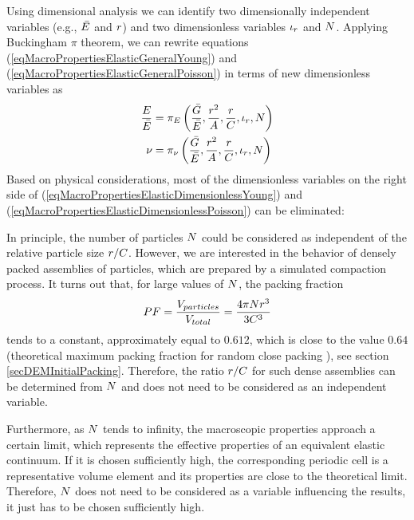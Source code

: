 Using dimensional analysis we can identify two dimensionally independent variables
(e.g., $\linkMaterialStiffnessNormal$ and $r$)
and two dimensionless variables $\iota_r$ and $N$.
Applying Buckingham $\pi$ theorem, we can rewrite equations (\ref{eqMacroPropertiesElasticGeneralYoung}) and (\ref{eqMacroPropertiesElasticGeneralPoisson}) in terms of new dimensionless variables as
\begin{align}
	\frac{\youngModulus}{\linkMaterialStiffnessNormal} &=
	\pi_\youngModulus \left(
		\frac{\linkMaterialStiffnessShear}{\linkMaterialStiffnessNormal},
		\frac{\radius^2}{\linkCrossSectionArea},
		\frac{\radius}{\cubeDimension},
		\interactionRatio,
		\numberOfParticles
	\right)
	\label{eqMacroPropertiesElasticDimensionlessYoung}
	\\
	\poissonRatio &= \pi_\poissonRatio \left(
		\frac{\linkMaterialStiffnessShear}{\linkMaterialStiffnessNormal},
		\frac{\radius^2}{\linkCrossSectionArea},
		\frac{\radius}{\cubeDimension},
		\interactionRatio,
		\numberOfParticles
	\right)
	\label{eqMacroPropertiesElasticDimensionlessPoisson}
\end{align}
Based on physical considerations, most of the dimensionless variables on the right side of (\ref{eqMacroPropertiesElasticDimensionlessYoung}) and (\ref{eqMacroPropertiesElasticDimensionlessPoisson}) can be eliminated:

In principle, the number of particles $N$ could be considered as independent of the relative particle size
$r/C$.
However, we are interested in the behavior of densely packed assemblies of particles, which are prepared by a simulated compaction process.
It turns out that, for large values of $N$, the packing fraction
\begin{equation}
	PF =
	\frac{V_{particles}}{V_{total}} =
	\frac{4\pi Nr^3}{3C^3}
\end{equation}
tends to a constant, approximately equal to
$0{.}612$,
which is close to the value $0{.}64$
(theoretical maximum packing fraction for random close packing \cite{TorquatoTruskettDebenedetti2000a}), see section \ref{secDEMInitialPacking}.
Therefore, the ratio $r/C$ for such dense assemblies can be determined from $N$ and does not need to be considered as an independent variable.

Furthermore, as $N$ tends to infinity, the macroscopic properties approach a certain limit,
which represents the effective properties of an equivalent elastic continuum.
If it is chosen sufficiently high, the corresponding periodic cell is a representative volume element and its properties are close to the theoretical limit.
Therefore, $N$ does not need to be considered as a variable influencing the results, it just has to be chosen
sufficiently high.

